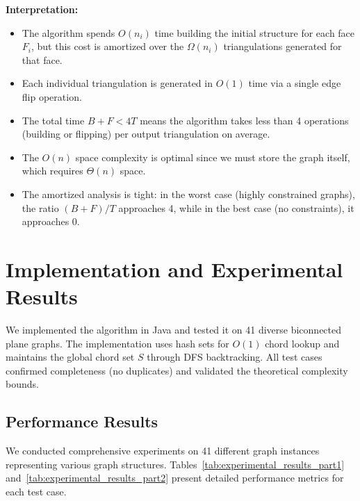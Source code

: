 \documentclass[12pt,a4paper]{article}
\theoremstyle{definition}
\theoremstyle{remark}
\begin{document}
\textbf{Interpretation:}

\begin{itemize}
\item The algorithm spends $O(n_i)$ time building the initial structure for each face $F_i$, but this cost is amortized over the $\Omega(n_i)$ triangulations generated for that face.

\item Each individual triangulation is generated in $O(1)$ time via a single edge flip operation.

\item The total time $B + F < 4T$ means the algorithm takes less than 4 operations (building or flipping) per output triangulation on average.

\item The $O(n)$ space complexity is optimal since we must store the graph itself, which requires $\Theta(n)$ space.

\item The amortized analysis is tight: in the worst case (highly constrained graphs), the ratio $(B+F)/T$ approaches 4, while in the best case (no constraints), it approaches 0.
\end{itemize}

\section{Implementation and Experimental Results}
\label{sec:implementation}

We implemented the algorithm in Java and tested it on 41 diverse biconnected plane graphs. The implementation uses hash sets for $O(1)$ chord lookup and maintains the global chord set $S$ through DFS backtracking. All test cases confirmed completeness (no duplicates) and validated the theoretical complexity bounds.

\subsection{Performance Results}

We conducted comprehensive experiments on 41 different graph instances representing various graph structures. Tables~\ref{tab:experimental_results_part1} and~\ref{tab:experimental_results_part2} present detailed performance metrics for each test case.
\end{document}
